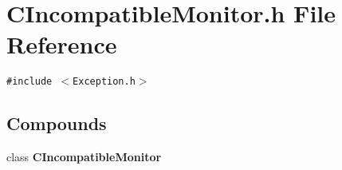 \section{CIncompatible\-Monitor.h File Reference}
\label{CIncompatibleMonitor_8h}
{\tt \#include $<$Exception.h$>$}\par
\subsection*{Compounds}
\begin{CompactItemize}
\item 
class {\bf CIncompatible\-Monitor}
\end{CompactItemize}
